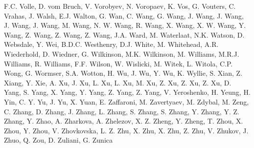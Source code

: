 F.C. Volle,
D. vom Bruch,
V. Vorobyev,
N. Voropaev,
K. Vos,
G. Vouters,
C. Vrahas,
J. Walsh,
E.J. Walton,
G. Wan,
C. Wang,
G. Wang,
J. Wang,
J. Wang,
J. Wang,
J. Wang,
M. Wang,
N. W.  Wang,
R. Wang,
X. Wang,
X. W.  Wang,
Y. Wang,
Z. Wang,
Z. Wang,
Z. Wang,
J.A. Ward,
M. Waterlaat,
N.K. Watson,
D. Websdale,
Y. Wei,
B.D.C. Westhenry,
D.J. White,
M. Whitehead,
A.R. Wiederhold,
D. Wiedner,
G. Wilkinson,
M.K. Wilkinson,
M. Williams,
M.R.J. Williams,
R. Williams,
F.F. Wilson,
W. Wislicki,
M. Witek,
L. Witola,
C.P. Wong,
G. Wormser,
S.A. Wotton,
H. Wu,
J. Wu,
Y. Wu,
K. Wyllie,
S. Xian,
Z. Xiang,
Y. Xie,
A. Xu,
J. Xu,
L. Xu,
L. Xu,
M. Xu,
Z. Xu,
Z. Xu,
Z. Xu,
D. Yang,
S. Yang,
X. Yang,
Y. Yang,
Z. Yang,
Z. Yang,
V. Yeroshenko,
H. Yeung,
H. Yin,
C. Y.  Yu,
J. Yu,
X. Yuan,
E. Zaffaroni,
M. Zavertyaev,
M. Zdybal,
M. Zeng,
C. Zhang,
D. Zhang,
J. Zhang,
L. Zhang,
S. Zhang,
S. Zhang,
Y. Zhang,
Y. Z.  Zhang,
Y. Zhao,
A. Zharkova,
A. Zhelezov,
X. Z.  Zheng,
Y. Zheng,
T. Zhou,
X. Zhou,
Y. Zhou,
V. Zhovkovska,
L. Z.  Zhu,
X. Zhu,
X. Zhu,
Z. Zhu,
V. Zhukov,
J. Zhuo,
Q. Zou,
D. Zuliani,
G. Zunica